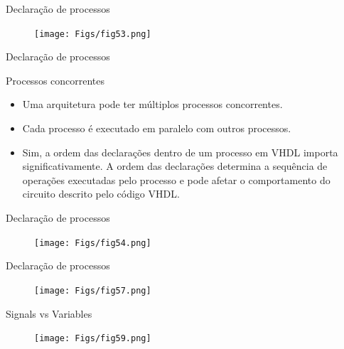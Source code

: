 \documentclass[aspectratio=169]{beamer}
\begin{document}
\begin{frame}{Declaração de processos}
	\justifying
	
	\begin{figure}[h]
		\centering
		\texttt{[image: Figs/fig53.png]}
	\end{figure}
	
\end{frame}
\begin{frame}{Declaração de processos}
	\justifying
	
	
	\begin{block}{Processos concorrentes}
	\begin{itemize}
		\item Uma arquitetura pode ter múltiplos processos concorrentes.
		\item Cada processo é executado em paralelo com outros processos. 
		\item Sim, a ordem das declarações dentro de um processo em VHDL importa significativamente. A ordem das declarações determina a sequência de operações executadas pelo processo e pode afetar o comportamento do circuito descrito pelo código VHDL.
	\end{itemize}
	
	\end{block}		
	
\end{frame}

\begin{frame}{Declaração de processos}
	\justifying
	
	\begin{figure}[h]
		\centering
		\texttt{[image: Figs/fig54.png]}
	\end{figure}
	
\end{frame}
\begin{frame}{Declaração de processos}
	\justifying
	
	
	\begin{figure}[h]
		\centering
		\texttt{[image: Figs/fig57.png]}
	\end{figure}
	
\end{frame}
\begin{frame}{Signals vs Variables}
	\justifying
	
	
	\begin{figure}[h]
		\centering
		\texttt{[image: Figs/fig59.png]}
	\end{figure}
	
\end{frame}
\end{document}

